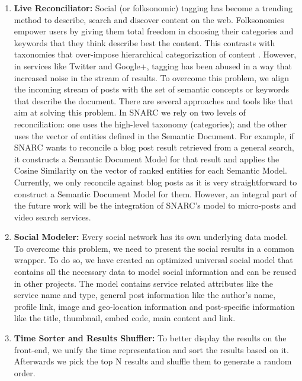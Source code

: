 \documentclass[oribibl]{llncs}
\begin{document}
\begin{enumerate}
\item {\bf Live Reconciliator:} Social (or folksonomic) tagging has become a trending method to describe, search and discover content on the web. Folksonomies empower users by giving them total freedom in choosing their categories and keywords that they think describe best the content. This contrasts with taxonomies that over-impose hierarchical categorization of content \cite{Zanardi2008}. However, in services like Twitter and Google+, tagging has been abused in a way that increased noise in the stream of results. To overcome this problem, we align the incoming stream of posts with the set of semantic concepts or keywords that describe the document. There are several approaches and tools like \cite{Cantador2011,Diaz-Aviles2012,Preotiuc-Pietro2012,Zanardi2008} that aim at solving this problem. In SNARC we rely on two levels of reconciliation: one uses the high-level taxonomy (categories); and the other uses the vector of entities defined in the Semantic Document. For example, if SNARC wants to reconcile a blog post result retrieved from a general search, it constructs a Semantic Document Model for that result and applies the Cosine Similarity on the vector of ranked entities for each Semantic Model. Currently, we only reconcile against blog posts as it is very straightforward to construct a Semantic Document Model for them. However, an integral part of the future work will be the integration of SNARC's model to micro-posts and video search services.

\item {\bf Social Modeler:} Every social network has its own underlying data model. To overcome this problem, we need to present the social results in a common wrapper. To do so, we have created an optimized universal social model that contains all the necessary data to model social information and can be reused in other projects. The model contains service related attributes like the service name and type, general post information like the author's name, profile link, image and geo-location information and post-specific information like the title, thumbnail, embed code, main content and link. 
\item {\bf Time Sorter and Results Shuffler:} To better display the results on the front-end, we unify the time representation and sort the results based on it. Afterwards we pick the top N results and shuffle them to generate a random order.
\end{enumerate}
\end{document}
